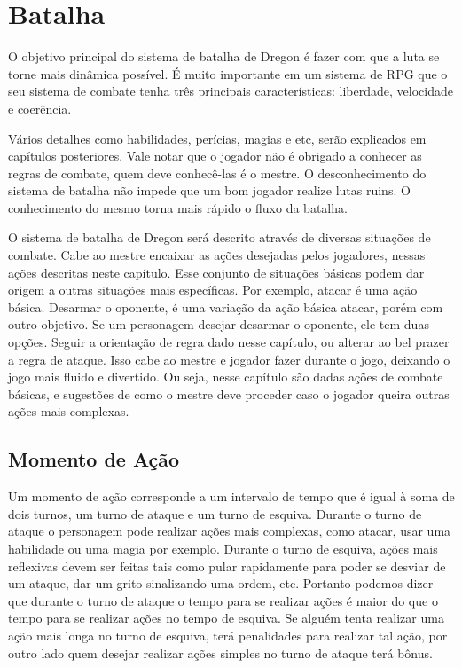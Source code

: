 
\chapter{Batalha}
\label{Cap:batalha}

O objetivo principal do sistema de batalha de Dregon é fazer com que a luta se torne mais dinâmica possível. É muito importante em um sistema de RPG que o seu sistema de combate tenha três principais características: liberdade, velocidade e coerência. 
	 
Vários detalhes como habilidades, perícias, magias e etc, serão explicados em capítulos posteriores. Vale notar que o jogador não é obrigado a conhecer as regras de combate, quem deve conhecê-las é o mestre. O desconhecimento do sistema de batalha não impede que um bom jogador realize lutas ruins. O conhecimento do mesmo torna mais rápido o fluxo da batalha.

O sistema de batalha de Dregon será descrito através de diversas situações de combate. Cabe ao mestre encaixar as ações desejadas pelos jogadores, nessas ações descritas neste capítulo. Esse conjunto de situações básicas podem dar origem a outras situações mais específicas. Por exemplo, atacar é uma ação básica. Desarmar o oponente, é uma variação da ação básica atacar, porém com outro objetivo. Se um personagem desejar desarmar o oponente, ele tem duas opções. Seguir a orientação de regra dado nesse capítulo, ou alterar ao bel prazer a regra de ataque. Isso cabe ao mestre e jogador fazer durante o jogo, deixando o jogo mais fluido e divertido. Ou seja, nesse capítulo são dadas ações de combate básicas, e sugestões de como o mestre deve proceder caso o jogador queira outras ações mais complexas.

\section{Momento de Ação}

Um momento de ação corresponde a um intervalo de tempo que é igual à soma de dois turnos, um turno de ataque e um turno de esquiva. Durante o turno de ataque o personagem pode realizar ações mais complexas, como atacar, usar uma habilidade ou uma magia por exemplo. Durante o turno de esquiva, ações mais reflexivas devem ser feitas tais como pular rapidamente para poder se desviar de um ataque, dar um grito sinalizando uma ordem, etc. Portanto podemos dizer que durante o turno de ataque o tempo para se realizar ações é maior do que o tempo para se realizar ações no tempo de esquiva. Se alguém tenta realizar uma ação mais longa no turno de esquiva, terá penalidades para realizar tal ação, por outro lado quem desejar realizar ações simples no turno de ataque terá bônus.

